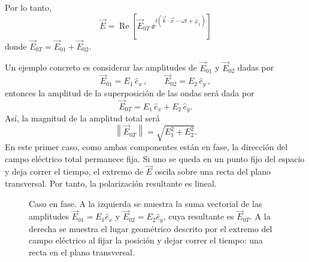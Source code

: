 \documentclass[../main.tex]{subfiles}
\begin{document}
Por lo tanto,
\begin{equation*}
    \vec E=  \operatorname{Re}\left[\vec E_{0T}\,\ee^{\ii\left(\vec k\cdot\vec x-\omega t+\varphi_1\right)}\right]
\end{equation*}
donde $\vec E_{0T}=\vec E_{01}+\vec E_{02}$.

Un ejemplo concreto es considerar las amplitudes de $\vec E_{01}$ y $\vec E_{02}$ dadas por
\begin{equation*}
    \vec E_{01}= E_1\,\hat e_x \, , \qquad \vec E_{02}= E_2\, \hat e_y \, ,
\end{equation*}
entonces la amplitud de la superposición de las ondas será dada por
\begin{equation*}
    \vec E_{0T}= E_1\,\hat e_x + E_2\, \hat e_y.
\end{equation*}
Así, la magnitud de la amplitud total será
\begin{equation*}
    \left\|\vec E_{0T}\right\|=\sqrt{E_1^2+E_2^2}.
\end{equation*}
En este primer caso, como ambas componentes están en fase, la dirección del campo eléctrico total permanece fija. Si uno se queda en un punto fijo del espacio y deja correr el tiempo, el extremo de $\vec E$ oscila sobre una recta del plano transversal. Por tanto, la polarización resultante es lineal.

\begin{figure}[ht]
    \centering
    \begingroup
    \shorthandoff{<>}
    \endgroup
    \caption{Caso en fase. A la izquierda se muestra la suma vectorial de las amplitudes $\vec E_{01}=E_1\hat e_x$ y $\vec E_{02}=E_2\hat e_y$, cuya resultante es $\vec E_{0T}$. A la derecha se muestra el lugar geométrico descrito por el extremo del campo eléctrico al fijar la posición y dejar correr el tiempo: una recta en el plano transversal.}
\end{figure}
\end{document}

